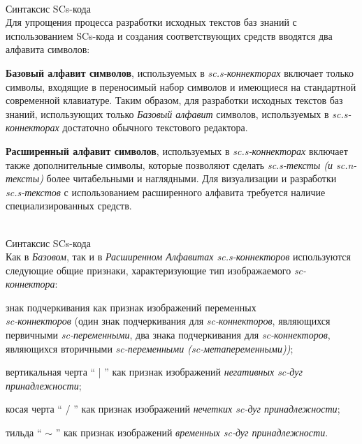 \begin{frame}{\\Синтаксис SCs-кода}
	\topline
	\justifying
	\vspace*{\fill}\\
	\vspace{10mm}
	Для упрощения процесса разработки исходных текстов баз знаний с использованием SCs-кода и создания соответствующих средств вводятся два алфавита символов:
	\begin{textitemize}
		\item \textbf{Базовый алфавит символов}, используемых в \textit{sc.s-коннекторах} включает только символы, входящие в переносимый набор символов и имеющиеся на стандартной современной клавиатуре. Таким образом, для разработки исходных текстов баз знаний, использующих только \textit{Базовый алфавит} символов, используемых в \textit{sc.s-коннекторах} достаточно обычного текстового редактора. 
		\item \textbf{Расширенный алфавит символов}, используемых в \textit{sc.s-коннекторах} включает также дополнительные символы, которые позволяют сделать \textit{sc.s-тексты (и sc.n-тексты)} более читабельными и наглядными. Для визуализации и разработки \textit{sc.s-текстов} с использованием расширенного алфавита требуется наличие специализированных средств.
	\end{textitemize}
\end{frame}

\begin{frame}{\\Синтаксис SCs-кода}
	\topline
	\justifying
	\vspace*{\fill}\\
	\vspace{10mm}
	Как в \textit{Базовом}, так и в \textit{Расширенном Алфавитах sc.s-коннекторов} используются следующие общие признаки, характеризующие тип изображаемого \textit{sc-коннектора}:
	\begin{textitemize}
		\item знак подчеркивания как признак изображений  переменных \\ \textit{sc-коннекторов} (один знак подчеркивания для \textit{sc-коннекторов}, являющихся первичными \textit{sc-переменными}, два знака подчеркивания для \textit{sc-коннекторов}, являющихся вторичными \textit{sc-переменными (sc-метапеременными))};
		\item вертикальная черта “ | ” как признак изображений \textit{негативных sc-дуг принадлежности};
		\item косая черта “ / ” как признак изображений \textit{нечетких sc-дуг принадлежности};
		\item тильда “ $\sim$ ” как признак изображений \textit{временных sc-дуг принадлежности}.
	\end{textitemize}
\end{frame}

